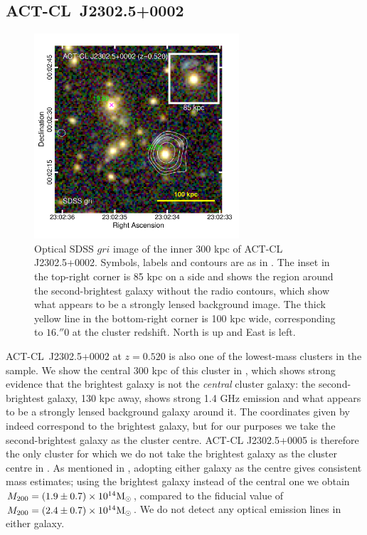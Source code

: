 \subsection{ACT-CL~J2302.5+0002}
\label{s:J2302}

\begin{figure}
 \centerline{\includegraphics[width=3in]{chapter3/ACT-CL_J23025+0002.pdf}}
\caption{Optical SDSS $gri$ image of the inner 300 kpc of ACT-CL J2302.5+0002. Symbols, labels and contours are as in . The inset in the top-right corner is 85 kpc on a side and shows the region around the second-brightest galaxy without the radio contours, which show what appears to be a strongly lensed background image. The thick yellow line in the bottom-right corner is 100 kpc wide, corresponding to $16.\!''0$ at the cluster redshift. North is up and East is left.}
\label{f:J2302}
\end{figure}

ACT-CL~J2302.5+0002 at $z=0.520$ is also one of the lowest-mass clusters in the sample. We show the central 300 kpc of this cluster in , which shows strong evidence that the brightest galaxy is not the \emph{central} cluster galaxy: the second-brightest galaxy, 130 kpc away, shows strong 1.4 GHz emission and what appears to be a strongly lensed background galaxy around it. The coordinates given by \cite{menanteau13} indeed correspond to the brightest galaxy, but for our purposes we take the second-brightest galaxy as the cluster centre. ACT-CL J2302.5+0005 is therefore the only cluster for which we do not take the brightest galaxy as the cluster centre in . As mentioned in , adopting either galaxy as the centre gives consistent mass estimates; using the brightest galaxy instead of the central one we obtain $M_{200}=(1.9\pm0.7)\times10^{14}{\rm M}_\odot$, compared to the fiducial value of $M_{200}=(2.4\pm0.7)\times10^{14}{\rm M}_\odot$. We do not detect any optical emission lines in either galaxy.

